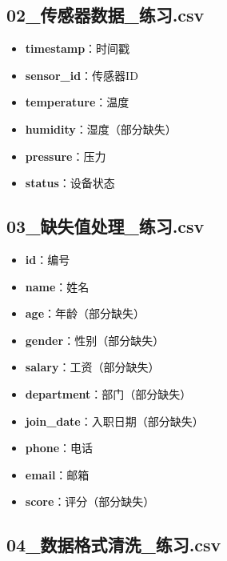 \documentclass[12pt,a4paper]{article}
\begin{document}
\subsection{02\_传感器数据\_练习.csv}

\begin{knowledgebox}[数据字段说明]
\begin{itemize}
    \item \textbf{timestamp}：时间戳
    \item \textbf{sensor\_id}：传感器ID
    \item \textbf{temperature}：温度
    \item \textbf{humidity}：湿度（部分缺失）
    \item \textbf{pressure}：压力
    \item \textbf{status}：设备状态
\end{itemize}
\end{knowledgebox}

\subsection{03\_缺失值处理\_练习.csv}

\begin{knowledgebox}[数据字段说明]
\begin{itemize}
    \item \textbf{id}：编号
    \item \textbf{name}：姓名
    \item \textbf{age}：年龄（部分缺失）
    \item \textbf{gender}：性别（部分缺失）
    \item \textbf{salary}：工资（部分缺失）
    \item \textbf{department}：部门（部分缺失）
    \item \textbf{join\_date}：入职日期（部分缺失）
    \item \textbf{phone}：电话
    \item \textbf{email}：邮箱
    \item \textbf{score}：评分（部分缺失）
\end{itemize}
\end{knowledgebox}

\subsection{04\_数据格式清洗\_练习.csv}
\end{document}
